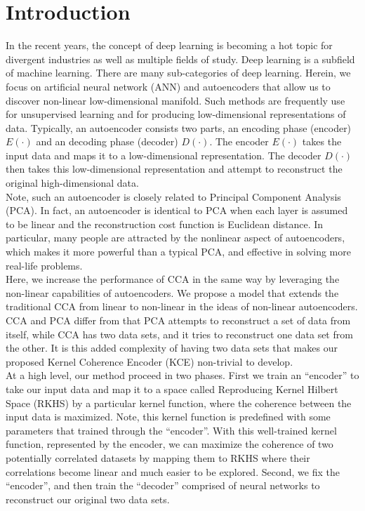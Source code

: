 \documentclass[12pt]{report} %
\begin{document}
\chapter{Introduction}
In the recent years, the concept of deep learning is becoming a hot topic for divergent industries as well as multiple fields of study\cite{AUKM,TF,PR,DLRG}. Deep learning is a subfield of machine learning. There are many sub-categories of deep learning. Herein, we focus on artificial neural network (ANN)\cite{NN,NN2} and autoencoders\cite{AE,AE2,AE3} that allow us to discover non-linear low-dimensional manifold. Such methods are frequently use for unsupervised learning and for producing low-dimensional representations of data. Typically, an autoencoder consists two parts, an encoding phase (encoder) \(E(\cdot)\) and an decoding phase (decoder) \(D(\cdot)\). The encoder \(E(\cdot)\) takes the input data and maps it to a low-dimensional representation. The decoder \(D(\cdot)\) then takes this low-dimensional representation and attempt to reconstruct the original high-dimensional data.\\
Note, such an autoencoder is closely related to Principal Component Analysis (PCA)\cite{PCA,PCA2,STAT,KPCA}. In fact, an autoencoder is identical to PCA when each layer is assumed to be linear and the reconstruction cost function is Euclidean distance. In particular, many people are attracted by the nonlinear aspect of autoencoders, which makes it more powerful than a typical PCA, and effective in solving more real-life problems. \\
Here, we increase the performance of CCA\cite{CCA,ECCA,KCCA} in the same way by leveraging the non-linear capabilities of autoencoders. We propose a model that extends the traditional CCA from linear to non-linear in the ideas of non-linear autoencoders. CCA and PCA differ from that PCA attempts to reconstruct a set of data from itself, while CCA has two data sets, and it tries to reconstruct one data set from the other. It is this added complexity of having two data sets that makes our proposed Kernel Coherence Encoder (KCE) non-trivial to develop. \\
At a high level, our method proceed in two phases. First we train an ``encoder'' to take our input data and map it to a space called Reproducing Kernel Hilbert Space (RKHS)\cite{RKHS} by a particular kernel function, where the coherence between the input data is maximized. Note, this kernel function is predefined with some parameters that trained through the ``encoder''. With this well-trained kernel function, represented by the encoder, we can maximize the coherence of two potentially correlated datasets by mapping them to RKHS where their correlations become linear and much easier to be explored. Second, we fix the ``encoder'', and then train the ``decoder'' comprised of neural networks to reconstruct our original two data sets.
\end{document}
